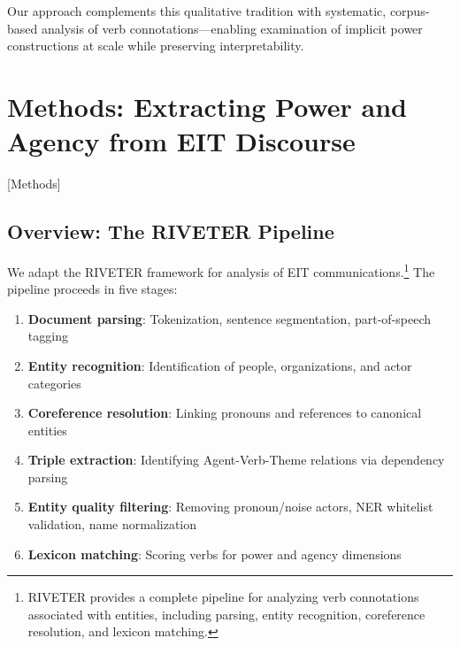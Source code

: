 \documentclass[../main.tex]{subfiles}
\begin{document}
Our approach complements this qualitative tradition with systematic, corpus-based analysis of verb connotations---enabling examination of implicit power constructions at scale while preserving interpretability.

\section{Methods: Extracting Power and Agency from EIT Discourse}[Methods]

\subsection{Overview: The RIVETER Pipeline}

We adapt the RIVETER framework \cite{antoniak2023riveter} for analysis of EIT communications.\footnote{RIVETER provides a complete pipeline for analyzing verb connotations associated with entities, including parsing, entity recognition, coreference resolution, and lexicon matching.} The pipeline proceeds in five stages:

\begin{enumerate}
    \item \textbf{Document parsing}: Tokenization, sentence segmentation, part-of-speech tagging
    \item \textbf{Entity recognition}: Identification of people, organizations, and actor categories
    \item \textbf{Coreference resolution}: Linking pronouns and references to canonical entities
    \item \textbf{Triple extraction}: Identifying Agent-Verb-Theme relations via dependency parsing
    \item \textbf{Entity quality filtering}: Removing pronoun/noise actors, NER whitelist validation, name normalization
    \item \textbf{Lexicon matching}: Scoring verbs for power and agency dimensions
\end{enumerate}
\end{document}
